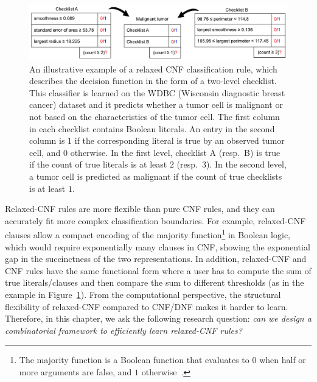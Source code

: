 \begin{figure}
	\begin{center}
		\includegraphics[scale=.62]{figures/interpretability/relaxed-cnf/checklist.pdf}
	\end{center}
	\caption[Illustration of a relaxed-CNF classification rule]{An illustrative example of a  relaxed CNF classification rule, which describes the decision function in the form of a  two-level checklist. This classifier is learned on the WDBC (Wisconsin diagnostic breast cancer) dataset and it predicts whether a tumor cell is malignant or not based on the characteristics of the  tumor cell. The first column in each checklist contains Boolean literals. An entry in the second column is  $ 1 $ if the corresponding literal is true by an observed tumor cell, and $ 0 $ otherwise. In the first level, checklist A (resp.\ B) is true if the count of true  literals is at least $ 2 $ (resp.\ $ 3 $). In the second level, a tumor cell is predicted as malignant if the count of true checklists is at least $ 1 $. }
	\label{interpretability_crr_exmpl:wdbc}
\end{figure}




 {Relaxed-CNF rules are  more flexible than pure CNF rules, and they can accurately fit more complex classification boundaries.} For example, relaxed-CNF clauses  allow  a compact encoding of the majority function\footnote{The majority function is a Boolean function that evaluates to $ 0 $ when half or more arguments are false, and $ 1 $ otherwise~\cite{peterson1972error}.} in Boolean logic, which would require exponentially many clauses in CNF, showing the exponential gap in the succinctness of the two representations.  In addition, relaxed-CNF and CNF rules have the same functional form where a user has to compute the sum of true literals/clauses  and then compare the sum  to  different thresholds {(as in the example in Figure~\ref{interpretability_crr_exmpl:wdbc})}. From the computational perspective, the structural flexibility of relaxed-CNF compared to CNF/DNF makes it harder to learn. Therefore, in this chapter, we ask the following research question: \textit{can we design a combinatorial framework to efficiently learn relaxed-CNF rules?}

